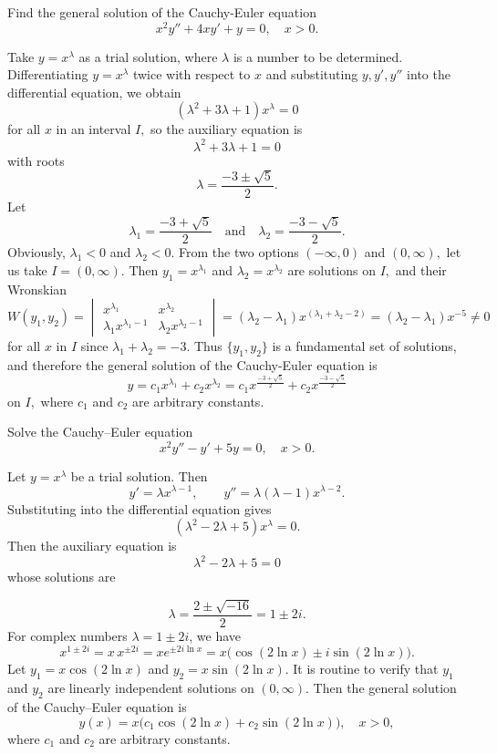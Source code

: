  \begin{example}\label{eg:Cauchy-Euler}
 	Find the general solution of
 the Cauchy-Euler equation
 \begin{equation}
 	x^2 y''+4xy'+y = 0,\quad x>0.
 \end{equation}   
 \end{example}
 \begin{solution}
 	Take $y = x^\lambda$ as a trial solution, where $\lambda$ is a number to be determined. Differentiating $y = x^\lambda$ twice with respect to $x$ and substituting $y, y', y''$ into the differential equation, we obtain
 	\[(\lambda^2+ 3\lambda +1)x^\lambda =0\] for all $x$ in an interval $I,$ so the auxiliary equation
 	is \[\lambda^2+ 3\lambda +1=0\] with roots
 		\[
 			\lambda = \frac{-3\pm \sqrt{5}}{2}.
 		\]
 		Let \[\lambda_1=\frac{-3+ \sqrt{5}}{2}\quad\mbox{and}\quad\lambda_2=\frac{-3- \sqrt{5}}{2}.\] Obviously, $\lambda_1<0$ and $\lambda_2<0.$ From the two options \((-\infty,0)\) and \((0, \infty),\)  let us take $I = (0, \infty).$
 		Then  $y_1 = x^{\lambda_1}$ and $\lambda_2 = x^{\lambda_2}$ are solutions on $I,$ and  their Wronskian
 		\[W(y_1, y_2) = \begin{vmatrix}
 			x^{\lambda_1}&x^{\lambda_2}\\
 			\lambda_1x^{\lambda_1-1}&\lambda_2x^{\lambda_2-1}
 		\end{vmatrix} = (\lambda_2-\lambda_1) x^{(\lambda_1+\lambda_2-2)}=(\lambda_2-\lambda_1) x^{-5} \ne 0\]
 		 for all $x$ in $I$ since \(\lambda_1+\lambda_2 = -3\). Thus \(\{y_1, y_2\}\) is a fundamental set of solutions, and therefore the general solution of the Cauchy-Euler equation is 
 		 \[y = c_1x^{\lambda_1}+c_2x^{\lambda_2} = c_1x^{\frac{-3+ \sqrt{5}}{2}}+c_2x^{\frac{-3- \sqrt{5}}{2}}\]
 	on \(I,\) where $c_1$ and $c_2$ are arbitrary constants.
 \end{solution}
 
 \begin{example}
 	Solve the Cauchy–Euler equation
 	\[
 	x^2 y'' - y' + 5y = 0, \quad x>0.
 	\]
 \end{example}
 \begin{solution}
 	Let \(y = x^\lambda\) be a trial solution. Then
 	\[
 	y' = \lambda x^{\lambda-1}, \qquad y'' = \lambda(\lambda-1)x^{\lambda-2}.
 	\]
 	Substituting into the differential equation gives
 	 \[(\lambda^2 - 2\lambda + 5)x^\lambda = 0.\]
 	Then the auxiliary equation is
 	\[\lambda^2 - 2\lambda + 5=0\] whose solutions are
 
 	\[
 \lambda = \frac{2 \pm \sqrt{-16}}{2} = 1 \pm 2i.
 	\]
 	For complex numbers \(\lambda = 1 \pm 2i\), we have
 	\[x^{1 \pm 2i}= x\, x^{\pm 2i}=  x e^{\pm 2i\ln x} = 
 	x\big(\cos(2 \ln x) \pm i \sin(2\ln x)\big).\]
 	Let $y_1 = x\cos(2 \ln x)$ and $y_2 = x\sin(2 \ln x).$ It is routine to verify that $y_1$ and $y_2$ are linearly independent solutions on $(0, \infty).$ Then the
 	 general solution of the Cauchy–Euler equation is
 	\[
 	y(x) = x \big(c_1 \cos(2 \ln x) + c_2 \sin(2 \ln x)\big), \quad x>0, 
 	\]
 	where $c_1$ and $c_2$ are arbitrary constants.
 \end{solution}
 
